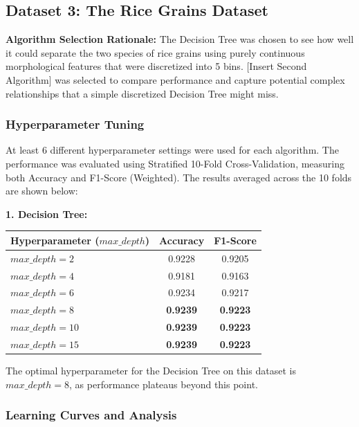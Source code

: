 \documentclass{article}
\begin{document}
\subsection{Dataset 3: The Rice Grains Dataset}


\textbf{Algorithm Selection Rationale:}
The Decision Tree was chosen to see how well it could separate the two species of rice grains using purely continuous morphological features that were discretized into 5 bins. [Insert Second Algorithm] was selected to compare performance and capture potential complex relationships that a simple discretized Decision Tree might miss.

\subsubsection{Hyperparameter Tuning}

At least 6 different hyperparameter settings were used for each algorithm. The performance was evaluated using Stratified 10-Fold Cross-Validation, measuring both Accuracy and F1-Score (Weighted).
The results averaged across the 10 folds are shown below:

\vspace{0.25cm}
\textbf{1. Decision Tree:}
\begin{table}[H]
\centering
\begin{tabular}{|l|c|c|}
\hline
\textbf{Hyperparameter ($max\_depth$)} & \textbf{Accuracy} & \textbf{F1-Score} \\ \hline
$max\_depth = 2$ & 0.9228 & 0.9205 \\ \hline
$max\_depth = 4$ & 0.9181 & 0.9163 \\ \hline
$max\_depth = 6$ & 0.9234 & 0.9217 \\ \hline
$max\_depth = 8$ & \textbf{0.9239} & \textbf{0.9223} \\ \hline
$max\_depth = 10$ & \textbf{0.9239} & \textbf{0.9223} \\ \hline
$max\_depth = 15$ & \textbf{0.9239} & \textbf{0.9223} \\ \hline
\end{tabular}
\end{table}
\noindent The optimal hyperparameter for the Decision Tree on this dataset is $max\_depth = 8$, as performance plateaus beyond this point.


\subsubsection{Learning Curves and Analysis}
\end{document}

